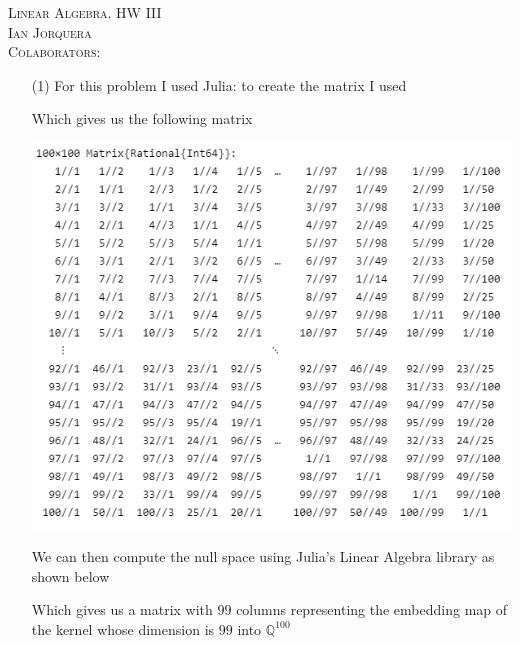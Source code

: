 \documentclass[12pt]{amsart}
\theoremstyle{definition}
\newcommand{\Q}{\mathbb{Q}}
\begin{document}
\begin{center}
    \textsc{Linear Algebra. HW III\\ Ian Jorquera\\ Colaborators:}
\end{center}
\vspace{1em}

\begin{itemize}
\item[(1)] For this problem I used Julia: to create the matrix I used 


Which gives us the following matrix

\includegraphics[scale=.6]{matp1.png}

We can then compute the null space using Julia's Linear Algebra library as shown below



Which gives us a matrix with $99$ columns representing the embedding map of the kernel whose dimension is $99$ into $\Q^{100}$


\end{itemize}
\end{document}
